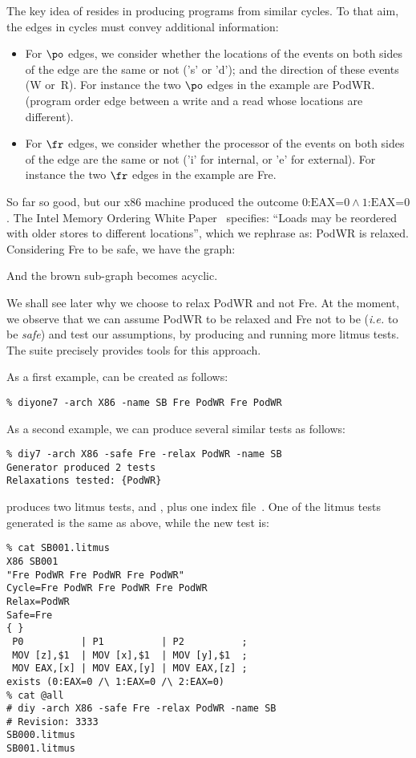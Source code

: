 The key idea of \diy{} resides in producing programs from similar
cycles. To that aim, the edges in cycles must convey additional
information:
\begin{itemize}
\item For $\po$ edges, we consider whether the locations
of the events on both sides of the edge are the same or not
('s' or 'd'); and the direction of these events (W or~R).
For instance the two $\po$ edges in the example are PodWR.
(program order edge between a write and a read whose locations are
different).
\item For $\fr$ edges, we consider whether the processor
of the events on both sides of the edge are the same or not
('i' for internal, or 'e' for external).
For instance the two $\fr$ edges in the example are Fre.
\end{itemize}

So far so good, but our x86 machine produced the outcome
\(\mbox{0:EAX} \mathord{=} \mbox{0} \wedge
\mbox{1:EAX} \mathord{=} \mbox{0}\).
The Intel Memory Ordering White Paper~\cite{intel:white}
specifies: ``Loads may be reordered with older stores to different locations'',
which we rephrase as: PodWR is relaxed.
Considering Fre to be safe, we have the graph:
\begin{center}
\end{center}
And the brown sub-graph becomes acyclic.

We shall see later why we choose to relax PodWR and not Fre.
At the moment, we observe that we can assume PodWR to be relaxed
and Fre not to be (\emph{i.e.} to be \emph{safe}) and test
our assumptions, by producing and running more litmus tests.
The \diy{} suite precisely provides tools for this approach.

\label{diyone:intro}As a first example,
can be created as follows:
\begin{verbatim}
% diyone7 -arch X86 -name SB Fre PodWR Fre PodWR
\end{verbatim}

As a second example, we can produce several similar tests
as follows:
\begin{verbatim}
% diy7 -arch X86 -safe Fre -relax PodWR -name SB
Generator produced 2 tests
Relaxations tested: {PodWR}
\end{verbatim}
\diy{} produces two litmus tests, 
and , plus one index file~.
One of the litmus tests generated is the same as above, while
the new test is:
\begin{verbatim}
% cat SB001.litmus
X86 SB001
"Fre PodWR Fre PodWR Fre PodWR"
Cycle=Fre PodWR Fre PodWR Fre PodWR
Relax=PodWR
Safe=Fre
{ }
 P0          | P1          | P2          ;
 MOV [z],$1  | MOV [x],$1  | MOV [y],$1  ;
 MOV EAX,[x] | MOV EAX,[y] | MOV EAX,[z] ;
exists (0:EAX=0 /\ 1:EAX=0 /\ 2:EAX=0)
% cat @all
# diy -arch X86 -safe Fre -relax PodWR -name SB
# Revision: 3333
SB000.litmus
SB001.litmus
\end{verbatim}

